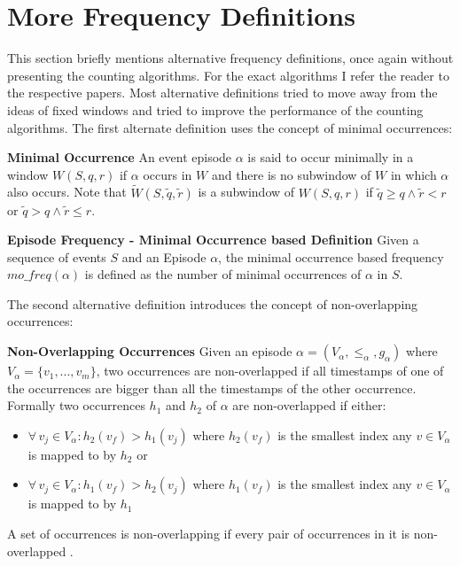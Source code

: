 \section{More Frequency Definitions}
\label{sec_otherFrequency}

This section briefly mentions alternative frequency definitions, once again without presenting the counting algorithms. For the exact algorithms I refer the reader to the respective papers. \newline
Most alternative definitions tried to move away from the ideas of fixed windows and tried to improve the performance of the counting algorithms. The first alternate definition uses the concept of minimal occurrences:

\begin{mydef}
\textbf{Minimal Occurrence} An event episode $\alpha$ is said to occur minimally in a window $W(S,q,r)$ if $\alpha$ occurs in $W$ and there is no subwindow of $W$ in which $\alpha$ also occurs. Note that $\tilde{W}(S,\tilde{q},\tilde{r})$ is a subwindow of $W(S,q,r)$ if $\tilde{q} \geq q \land \tilde{r} < r $ or $\tilde{q} > q \land \tilde{r} \leq r $.
\end{mydef}

\begin{mydef}
\label{def_minimalOccuranceFrequency}
\textbf{Episode Frequency - Minimal Occurrence based Definition} Given a sequence of events $S$ and an Episode $\alpha$, the minimal occurrence based frequency $mo\_freq(\alpha )$ is defined as the number of minimal occurrences of $\alpha$ in $S$. \cite{laxman2006discovering}
\end{mydef}

The second alternative definition introduces the concept of non-overlapping occurrences:

\begin{mydef}
\textbf{Non-Overlapping Occurrences} Given an episode $\alpha = (V_\alpha,{\leq}_{\alpha},g_\alpha)$ where $V_\alpha = \{v_1,...,v_m\}$, two occurrences are non-overlapped if all timestamps of one of the occurrences are bigger than all the timestamps of the other occurrence. Formally two occurrences $h_1$ and $h_2$ of $\alpha$ are non-overlapped if either:
\begin{itemize}
	\item $\forall \, v_j \in V_\alpha : h_2(v_f)>h_1(v_j)$ where $h_2(v_f)$ is the smallest index any $v \in V_\alpha$ is mapped to by $h_2$ or 
	\item $\forall \, v_j \in V_\alpha : h_1(v_f)>h_2(v_j)$ where $h_1(v_f)$ is the smallest index any $v \in V_\alpha$ is mapped to by $h_1$
\end{itemize}
A set of occurrences is non-overlapping if every pair of occurrences in it is non-overlapped \cite{laxman2007fast}.
\end{mydef}

